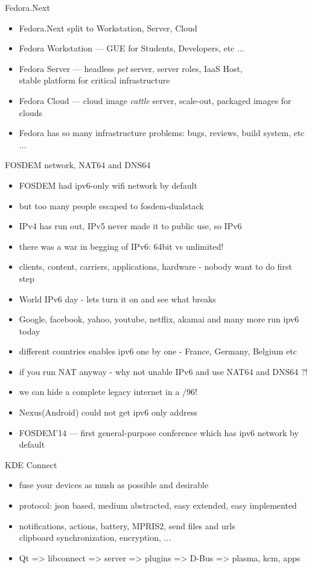 \documentclass[aspectratio=169]{beamer}
\begin{document}
\begin{frame}{Fedora.Next}
  \begin{itemize}
  \item Fedora.Next split to Workstation, Server, Cloud
  \item Fedora Workstation --- GUE for Students, Developers, etc ...
  \item Fedora Server --- headless {\it pet} server, server roles, IaaS Host,
        \\stable platform for critical infrastructure
  \item Fedora Cloud --- cloud image {\it cattle} server, scale-out, packaged images for clouds
  \item Fedora has so many infrastructure problems: bugs, reviews, build system, etc ...
  \end{itemize}
\end{frame}

\begin{frame}{FOSDEM network, NAT64 and DNS64}
  \begin{itemize}
  \item FOSDEM had ipv6-only wifi network by default
  \item but too many people escaped to fosdem-dualstack
  \item IPv4 has run out, IPv5 never made it to public use, so IPv6
  \item there was a war in begging of IPv6: 64bit vs unlimited!
  \item clients, content, carriers, applications, hardware - nobody want to do first step
  \item World IPv6 day - lets turn it on and see what breaks
  \item Google, facebook, yahoo, youtube, netflix, akamai and many more run ipv6 today
  \item different countries enables ipv6 one by one - France, Germany, Belgium etc
  \item if you run NAT anyway - why not unable IPv6 and use NAT64 and DNS64 ?!
  \item we can hide a complete legacy internet in a /96!
  \item Nexus(Android) could not get ipv6 only address
  \item FOSDEM'14 --- first general-purpose conference which has ipv6 network by default
  \end{itemize}
\end{frame}

\begin{frame}{KDE Connect}
  \begin{itemize}
  \item fuse your devices as mush as possible and desirable
  \item protocol: json based, medium abstracted, easy extended, easy implemented
  \item notifications, actions, battery, MPRIS2, send files and urls
        \\clipboard synchronization, encryption, ...
  \item Qt => libconnect => server => plugins => D-Bus => plasma, kcm, apps
  \end{itemize}
\end{frame}  
  
\end{document}
